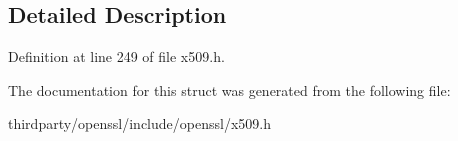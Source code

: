 \subsection{Detailed Description}


Definition at line 249 of file x509.\+h.



The documentation for this struct was generated from the following file\+:\begin{DoxyCompactItemize}
\item 
thirdparty/openssl/include/openssl/x509.\+h\end{DoxyCompactItemize}
